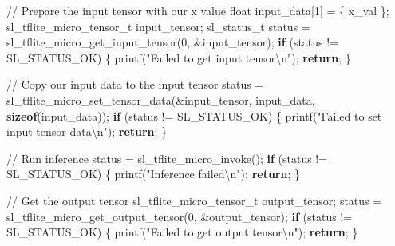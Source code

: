 \documentclass[
  9pt,
  letterpaper,
  abstract,
  titlepage]{scrbook}
\newenvironment{Shaded}{\begin{snugshade}}{\end{snugshade}}
\newcommand{\CommentTok}[1]{\textcolor[rgb]{0.37,0.37,0.37}{#1}}
\newcommand{\ControlFlowTok}[1]{\textcolor[rgb]{0.00,0.23,0.31}{\textbf{#1}}}
\newcommand{\DataTypeTok}[1]{\textcolor[rgb]{0.68,0.00,0.00}{#1}}
\newcommand{\DecValTok}[1]{\textcolor[rgb]{0.68,0.00,0.00}{#1}}
\newcommand{\KeywordTok}[1]{\textcolor[rgb]{0.00,0.23,0.31}{\textbf{#1}}}
\newcommand{\NormalTok}[1]{\textcolor[rgb]{0.00,0.23,0.31}{#1}}
\newcommand{\OperatorTok}[1]{\textcolor[rgb]{0.37,0.37,0.37}{#1}}
\newcommand{\SpecialCharTok}[1]{\textcolor[rgb]{0.37,0.37,0.37}{#1}}
\newcommand{\StringTok}[1]{\textcolor[rgb]{0.13,0.47,0.30}{#1}}
\begin{document}
\begin{Shaded}
\begin{Highlighting}[]
  \CommentTok{// Prepare the input tensor with our x value}
  \DataTypeTok{float}\NormalTok{ input\_data}\OperatorTok{[}\DecValTok{1}\OperatorTok{]} \OperatorTok{=} \OperatorTok{\{}\NormalTok{ x\_val }\OperatorTok{\};}
\NormalTok{  sl\_tflite\_micro\_tensor\_t input\_tensor}\OperatorTok{;}
\NormalTok{  sl\_status\_t status }\OperatorTok{=}\NormalTok{ sl\_tflite\_micro\_get\_input\_tensor}\OperatorTok{(}\DecValTok{0}\OperatorTok{,} \OperatorTok{\&}\NormalTok{input\_tensor}\OperatorTok{);}
  \ControlFlowTok{if} \OperatorTok{(}\NormalTok{status }\OperatorTok{!=}\NormalTok{ SL\_STATUS\_OK}\OperatorTok{)} \OperatorTok{\{}
\NormalTok{    printf}\OperatorTok{(}\StringTok{"Failed to get input tensor}\SpecialCharTok{\textbackslash{}n}\StringTok{"}\OperatorTok{);}
    \ControlFlowTok{return}\OperatorTok{;}
  \OperatorTok{\}}
  
  \CommentTok{// Copy our input data to the input tensor}
\NormalTok{  status }\OperatorTok{=}\NormalTok{ sl\_tflite\_micro\_set\_tensor\_data}\OperatorTok{(\&}\NormalTok{input\_tensor}\OperatorTok{,}\NormalTok{ input\_data}\OperatorTok{,} \KeywordTok{sizeof}\OperatorTok{(}\NormalTok{input\_data}\OperatorTok{));}
  \ControlFlowTok{if} \OperatorTok{(}\NormalTok{status }\OperatorTok{!=}\NormalTok{ SL\_STATUS\_OK}\OperatorTok{)} \OperatorTok{\{}
\NormalTok{    printf}\OperatorTok{(}\StringTok{"Failed to set input tensor data}\SpecialCharTok{\textbackslash{}n}\StringTok{"}\OperatorTok{);}
    \ControlFlowTok{return}\OperatorTok{;}
  \OperatorTok{\}}
  
  \CommentTok{// Run inference}
\NormalTok{  status }\OperatorTok{=}\NormalTok{ sl\_tflite\_micro\_invoke}\OperatorTok{();}
  \ControlFlowTok{if} \OperatorTok{(}\NormalTok{status }\OperatorTok{!=}\NormalTok{ SL\_STATUS\_OK}\OperatorTok{)} \OperatorTok{\{}
\NormalTok{    printf}\OperatorTok{(}\StringTok{"Inference failed}\SpecialCharTok{\textbackslash{}n}\StringTok{"}\OperatorTok{);}
    \ControlFlowTok{return}\OperatorTok{;}
  \OperatorTok{\}}
  
  \CommentTok{// Get the output tensor}
\NormalTok{  sl\_tflite\_micro\_tensor\_t output\_tensor}\OperatorTok{;}
\NormalTok{  status }\OperatorTok{=}\NormalTok{ sl\_tflite\_micro\_get\_output\_tensor}\OperatorTok{(}\DecValTok{0}\OperatorTok{,} \OperatorTok{\&}\NormalTok{output\_tensor}\OperatorTok{);}
  \ControlFlowTok{if} \OperatorTok{(}\NormalTok{status }\OperatorTok{!=}\NormalTok{ SL\_STATUS\_OK}\OperatorTok{)} \OperatorTok{\{}
\NormalTok{    printf}\OperatorTok{(}\StringTok{"Failed to get output tensor}\SpecialCharTok{\textbackslash{}n}\StringTok{"}\OperatorTok{);}
    \ControlFlowTok{return}\OperatorTok{;}
  \OperatorTok{\}}
  

\end{Highlighting}
\end{Shaded}
\end{document}
